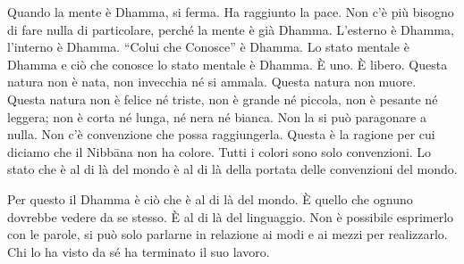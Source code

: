 Quando la mente è Dhamma, si ferma. Ha raggiunto la pace. Non c'è più
bisogno di fare nulla di particolare, perché la mente è già Dhamma.
L'esterno è Dhamma, l'interno è Dhamma. ``Colui che Conosce'' è Dhamma.
Lo stato mentale è Dhamma e ciò che conosce lo stato mentale è Dhamma. È
uno. È libero. Questa natura non è nata, non invecchia né si ammala.
Questa natura non muore. Questa natura non è felice né triste, non è
grande né piccola, non è pesante né leggera; non è corta né lunga, né
nera né bianca. Non la si può paragonare a nulla. Non c'è convenzione
che possa raggiungerla. Questa è la ragione per cui diciamo che il
Nibbāna non ha colore. Tutti i colori sono solo convenzioni. Lo
stato che è al di là del mondo è al di là della portata delle
convenzioni del mondo.

Per questo il Dhamma è ciò che è al di là del mondo. È quello che ognuno
dovrebbe vedere da se stesso. È al di là del linguaggio. Non è possibile
esprimerlo con le parole, si può solo parlarne in relazione ai modi e ai
mezzi per realizzarlo. Chi lo ha visto da sé ha terminato il suo lavoro.

